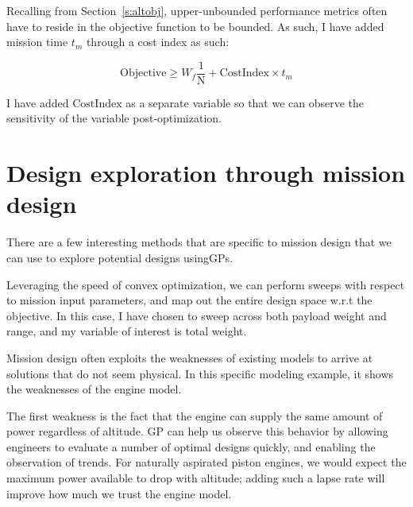 Recalling from Section~\ref{s:altobj}, upper-unbounded performance metrics often have to
reside in the objective function to be bounded. As such, I have added mission time $t_m$ through a cost index as such:

\begin{equation}
    \mathrm{Objective} \geq W_f \frac{1}{\mathrm{N}} + \mathrm{Cost Index} \times t_m
    \label{e:missionobj}
\end{equation}

I have added $\mathrm{Cost Index}$ as a separate variable so that we can observe the sensitivity
of the variable post-optimization.

\section{Design exploration through mission design}

There are a few interesting methods that are specific to mission design that we can use to explore
potential designs using\gls{GP}s.

Leveraging the speed of convex optimization, we can perform sweeps with respect to mission input
parameters, and map out the entire design space w.r.t the objective. In this case, I have chosen to
sweep across both payload weight and range, and my variable of interest is total weight.






Mission design often exploits the weaknesses of existing models to arrive at solutions
that do not seem physical. In this specific modeling example, it shows the weaknesses of the engine model.

The first weakness is the fact that the engine can supply the same amount of power
regardless of altitude. \gls{GP} can help us observe this behavior by allowing engineers to
evaluate a number of optimal designs quickly, and enabling the observation of trends.
For naturally aspirated piston engines, we would expect the maximum power available to
drop with altitude; adding such a lapse rate will improve how much we trust the engine model.

